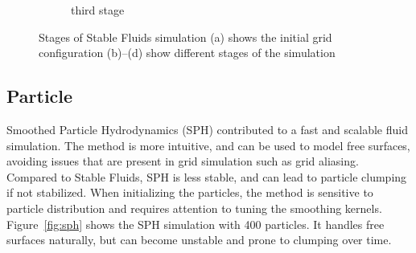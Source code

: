 \begin{figure}[h]
\begin{subfigure}[b]{0.2\textwidth}
        \caption{third stage}
    \end{subfigure}
    \caption{Stages of Stable Fluids simulation 
    (a) shows the initial grid configuration
    (b)–(d) show different stages of the simulation}
    \label{fig:grid}
\end{figure}

\subsection{Particle}
Smoothed Particle Hydrodynamics (SPH) contributed to a fast and scalable fluid simulation. The method is more intuitive, and can be used to model free surfaces, avoiding issues that are present in grid simulation such as grid aliasing.
Compared to Stable Fluids, SPH is less stable, and can lead to particle clumping if not stabilized. When initializing the particles, the method is sensitive to particle distribution and requires attention to tuning the smoothing kernels. Figure~\ref{fig:sph} shows the SPH simulation with 400 particles. It handles free surfaces naturally, but can become unstable and prone to clumping over time.

